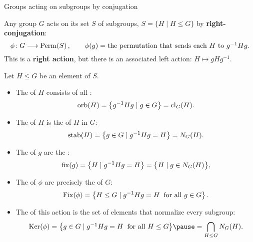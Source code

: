 \documentclass[8pt, handout]{beamer}
\newcommand{\Pause}{\pause}      %
\begin{document}
\begin{frame}{Groups acting on subgroups by conjugation} \smallskip
  
  Any group $G$ acts on its set $S$ of subgroups, $S = \{H \mid H \leq G\}$ by
  \textbf{right-conjugation}:
  \[
  \phi\colon G\longrightarrow\operatorname{Perm}(S)\,,\qquad
  \phi(g)=\mbox{the permutation that sends each $H$ to
    $g^{-1}Hg$.}
  \]
  \Pause This is a \textbf{right action}, but there is an associated left
  action: $H\mapsto gHg^{-1}$.
  
  \medskip\Pause

  Let $H\leq G$ be an element of $S$. \smallskip\Pause
  \begin{itemize}
  \item The  of $H$ consists of all : %
    \[
    \operatorname{orb}(H)=\big\{g^{-1}Hg\mid g\in G\big\}=\operatorname{cl}_G(H).
    \]
    \vspace{-4mm}\Pause
  \item The  of $H$ is the
     of $H$ in $G$: 
    \[
    \operatorname{stab}(H)=\big\{g\in G\mid g^{-1}Hg=H\big\}=N_G(H).
    \]
    \vspace{-4mm}\Pause
  \item The  of $g$ are the
    :
    \[
    \operatorname{fix}(g)=\big\{H\mid g^{-1}Hg=H\big\}=\big\{H\mid g\in N_G(H)\big\},
    \]
    \vspace{-4mm}\Pause
  \item The  of $\phi$ are precisely the
     of $G$: %
    \[
    \operatorname{Fix}(\phi)=\big\{H\leq G\mid g^{-1}Hg=H\;\;\text{for all }g\in G\big\}\,.
    \]
    \vspace{-4mm}\Pause
  \item The  of this action is the set of elements that
    normalize every subgroup:
    \[
    \begin{array}{c@{\hspace{1mm}}c@{\hspace{1mm}}l}
      \Ker(\phi)
      &=&\big\{g\in G\mid g^{-1}Hg=H\;\;\text{for all }H\leq G\big\}
      \Pause=\displaystyle\bigcap_{H\leq G} N_G(H).
    \end{array}
    \]
  \end{itemize}
  
\end{frame}

\end{document}
